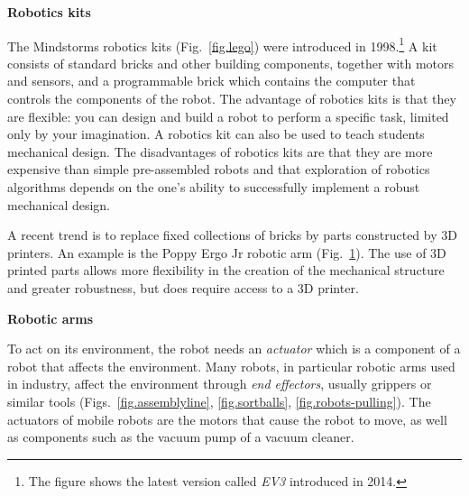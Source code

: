 \medskip

\noindent\textbf{Robotics kits}

The \lego{} Mindstorms robotics kits (Fig.~\ref{fig.lego}) were introduced in 1998.\footnote{The figure shows the latest version called \emph{EV3} introduced in 2014.} A kit consists of standard \lego{} bricks and other building components, together with motors and sensors, and a programmable brick which contains the computer that controls the components of the robot. The advantage of robotics kits is that they are flexible: you can design and build a robot to perform a specific task, limited only by your imagination. A robotics kit can also be used to teach students mechanical design. The disadvantages of robotics kits are that they are more expensive than simple pre-assembled robots and that exploration of robotics algorithms depends on the one's ability to successfully implement a robust mechanical design.

A recent trend is to replace fixed collections of bricks by parts constructed by 3D printers. An example is the Poppy Ergo Jr robotic arm (Fig.~\ref{fig.poppy}). The use of 3D printed parts allows more flexibility in the creation of the mechanical structure and greater robustness, but does require access to a 3D printer. 

\begin{figure}
\subfigures
\begin{minipage}{\textwidth}
\hspace{\fill}
\end{minipage}
\label{fig.lego}
\label{fig.poppy}
\end{figure}

\medskip

\noindent\textbf{Robotic arms}

To act on its environment, the robot needs an \emph{actuator} which is a component of a robot that affects the environment. Many robots, in particular robotic arms used in industry, affect the environment through \emph{end effectors}, usually grippers or similar tools (Figs.~\ref{fig.assemblyline}, \ref{fig.sortballs}, \ref{fig.robots-pulling}). The actuators of mobile robots are the motors that cause the robot to move, as well as components such as the vacuum pump of a vacuum cleaner.

